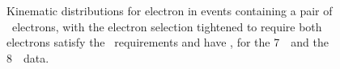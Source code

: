 \begin{figure}[h]
{        }
    \caption[Lepton kinematic distributions for \dilep\ events in the 7~\tev\
    data. ]
    {\small Kinematic distributions for
    electron  in events containing a pair of
    \ossf\ electrons, with the electron selection tightened to require both
    electrons satisfy the \mediumPP\ requirements and have \ptgt{20}, for the 7~\tev\ and the 8~\tev\ data. }
\label{fig:dilep-lepkin-seven}
\end{figure}

